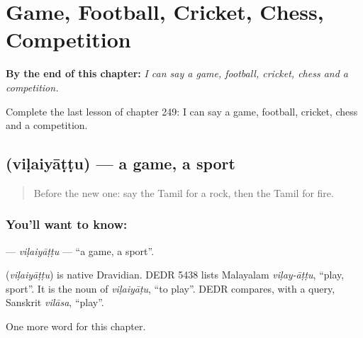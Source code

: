 
\chapter{Game, Football, Cricket, Chess, Competition}
\label{ch:ta-game-football-cricket-chess-competition}

\begin{chapteropening}
\textbf{By the end of this chapter:} \emph{I can say a game, football, cricket, chess and a competition.}

Complete the last lesson of chapter 249: I can say a game, football, cricket, chess and a competition.
\end{chapteropening}

\section[\texorpdfstring{\ta{விளையாட்டு} (viḷaiyāṭṭu)}{விளையாட்டு (viḷaiyāṭṭu)}]{ (viḷaiyāṭṭu) — a game, a sport}

\label{lesson:TA-C249-vilaiyattu}



\begin{quote}
Before the new one: say the Tamil for a rock, then the Tamil for fire.
\end{quote}

\subsection*{You'll want to know: }
\textbf{} — \emph{viḷaiyāṭṭu} — \textquotedblleft{}a game, a sport\textquotedblright{}.

\begin{cousinweb}
\textbf{} (\emph{viḷaiyāṭṭu}) is native Dravidian. DEDR 5438 lists Malayalam \emph{viḷay-āṭṭu}, \textquotedblleft{}play, sport\textquotedblright{}. It is the noun of \emph{viḷaiyāṭu}, \textquotedblleft{}to play\textquotedblright{}. DEDR compares, with a query, Sanskrit \emph{vilāsa}, \textquotedblleft{}play\textquotedblright{}.
\end{cousinweb}

\begin{grammarlens}[title={What you've built}]
One more word for this chapter.
\end{grammarlens}

